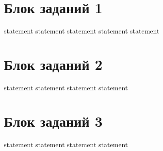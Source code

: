 \section{Блок заданий 1}

{statement}
{statement}
{statement}
{statement}
{statement}

\section{Блок заданий 2}

{statement}
{statement}
{statement}
{statement}

\section{Блок заданий 3}

{statement}
{statement}
{statement}
{statement}